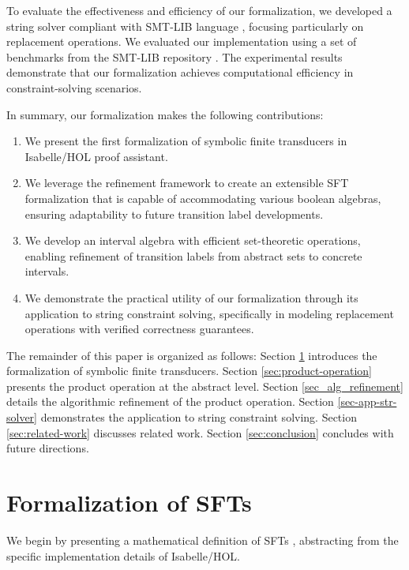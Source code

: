 \documentclass[sigplan,10pt,anonymous,review]{acmart}\settopmatter{printfolios=true,printccs=false,printacmref=false}
\begin{document}
To evaluate the effectiveness and efficiency of our formalization, we developed a string solver compliant with SMT-LIB language \cite{smtlib}, focusing particularly on replacement operations. We evaluated our implementation using a set of benchmarks from the SMT-LIB repository \cite{smtlib_benchmarks}. The experimental results demonstrate that our formalization achieves computational efficiency in constraint-solving scenarios.



In summary, our formalization makes the following contributions:
\begin{enumerate}
\item We present the first formalization of symbolic finite transducers in Isabelle/HOL proof assistant.
\item We leverage the refinement framework to create an extensible SFT formalization that is capable of accommodating various boolean algebras, ensuring adaptability to future transition label developments.
\item We develop an interval algebra with efficient set-theoretic operations, enabling refinement of transition labels from abstract sets to concrete intervals.
\item We demonstrate the practical utility of our formalization through its application to string constraint solving, specifically in modeling replacement operations with verified correctness guarantees.
\end{enumerate}

The remainder of this paper is organized as follows:
Section \ref{sec:formalization} introduces the formalization of symbolic finite transducers.
Section \ref{sec:product-operation} presents the product operation at the abstract level.
Section \ref{sec_alg_refinement} details the algorithmic refinement of the product operation.
Section \ref{sec-app-str-solver} demonstrates the application to string constraint solving.
Section \ref{sec:related-work} discusses related work.
Section \ref{sec:conclusion} concludes with future directions. 




\section{Formalization of SFTs}
\label{sec:formalization}


We begin by presenting a mathematical definition of SFTs \cite{VeanesHLMB12Transducer}, abstracting from the specific implementation details of Isabelle/HOL. 
\end{document}
